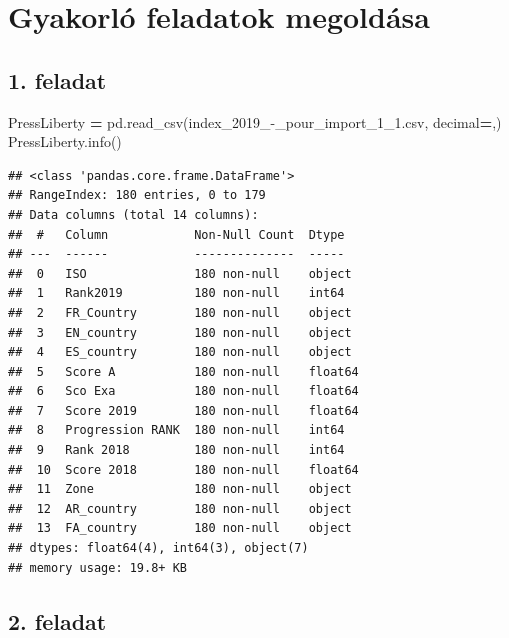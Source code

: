 \documentclass[
]{book}
\newenvironment{Shaded}{\begin{snugshade}}{\end{snugshade}}
\newcommand{\NormalTok}[1]{#1}
\newcommand{\OperatorTok}[1]{\textcolor[rgb]{0.81,0.36,0.00}{\textbf{#1}}}
\newcommand{\StringTok}[1]{\textcolor[rgb]{0.31,0.60,0.02}{#1}}
\begin{document}
\section*{Gyakorló feladatok megoldása}\label{gyakorluxf3-feladatok-megolduxe1sa}

\subsection*{1. feladat}\label{feladat}

\begin{Shaded}
\begin{Highlighting}[]
\NormalTok{PressLiberty }\OperatorTok{=}\NormalTok{ pd.read\_csv(}\StringTok{\textquotesingle{}index\_2019\_{-}\_pour\_import\_1\_1.csv\textquotesingle{}}\NormalTok{, decimal}\OperatorTok{=}\StringTok{\textquotesingle{},\textquotesingle{}}\NormalTok{)}
\NormalTok{PressLiberty.info()}
\end{Highlighting}
\end{Shaded}

\begin{verbatim}
## <class 'pandas.core.frame.DataFrame'>
## RangeIndex: 180 entries, 0 to 179
## Data columns (total 14 columns):
##  #   Column            Non-Null Count  Dtype  
## ---  ------            --------------  -----  
##  0   ISO               180 non-null    object 
##  1   Rank2019          180 non-null    int64  
##  2   FR_Country        180 non-null    object 
##  3   EN_country        180 non-null    object 
##  4   ES_country        180 non-null    object 
##  5   Score A           180 non-null    float64
##  6   Sco Exa           180 non-null    float64
##  7   Score 2019        180 non-null    float64
##  8   Progression RANK  180 non-null    int64  
##  9   Rank 2018         180 non-null    int64  
##  10  Score 2018        180 non-null    float64
##  11  Zone              180 non-null    object 
##  12  AR_country        180 non-null    object 
##  13  FA_country        180 non-null    object 
## dtypes: float64(4), int64(3), object(7)
## memory usage: 19.8+ KB
\end{verbatim}

\subsection*{2. feladat}\label{feladat-1}
\end{document}
